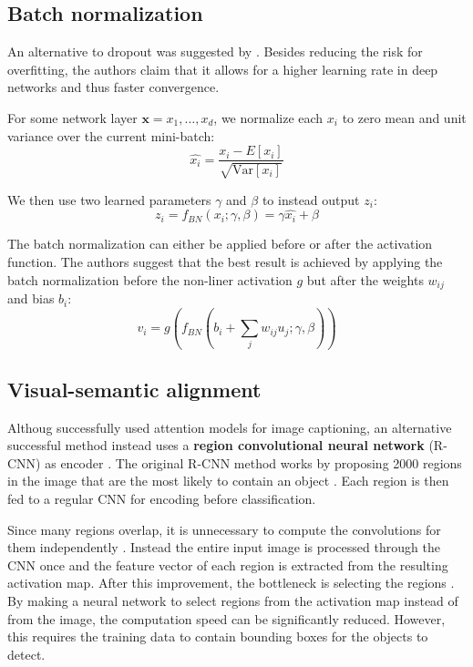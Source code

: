 \subsection{Batch normalization}

An alternative to dropout was suggested by \textcite{BatchNormalization}. Besides reducing the risk for overfitting, the authors claim that it allows for a higher learning rate in deep networks and thus faster convergence.

For some network layer $\mathbf{x} = {x_1, \ldots, x_d}$, we normalize each $x_i$ to zero mean and unit variance over the current mini-batch:
\[
\hat{x_i} = \frac{x_i - E[x_i]}{ \sqrt{\text{Var} [x_i]} }
\]

We then use two learned parameters $\gamma$ and $\beta$ to instead output $z_i$:
\[
z_i = f_{BN}(x_i; \gamma, \beta) = \gamma \hat{x_i} + \beta
\]

The batch normalization can either be applied before or after the activation function. The authors suggest that the best result is achieved by applying the batch normalization before the non-liner activation $g$ but after the weights $w_{ij}$ and bias $b_i$:
\[
v_i = g\left( f_{BN}\left( b_i + \sum_j w_{ij} u_j; \gamma, \beta \right) \right)
\]

\subsection{Visual-semantic alignment}


Althoug \textcite{AttendAndTell} successfully used attention models for image captioning,
an alternative successful method instead uses a \textbf{region convolutional neural network} (R-CNN) as encoder \cite{VisualSemanticAlignment}.
The original R-CNN method works by proposing 2000 regions in the image that are the most likely to contain an object \cite{RCNN}. Each region is then fed to a regular CNN for encoding before classification.

Since many regions overlap, it is unnecessary to compute the convolutions for them independently \cite{FastRCNN}. Instead the entire input image is processed through the CNN once and the feature vector of each region is extracted from the resulting activation map. After this improvement, the bottleneck is selecting the regions \cite{FasterRCNN}. By making a neural network to select regions from the activation map instead of from the image, the computation speed can be significantly reduced. However, this requires the training data to contain bounding boxes for the objects to detect.

